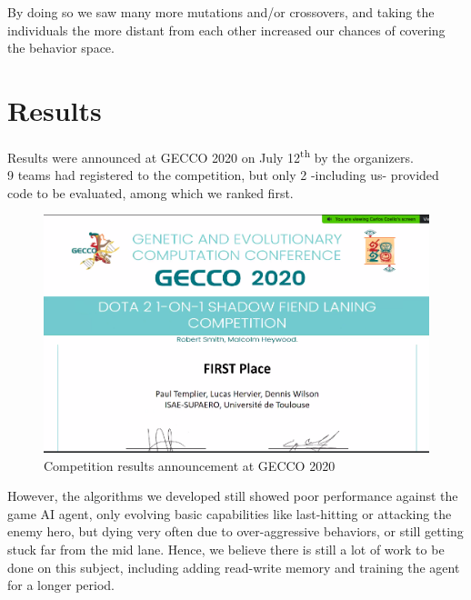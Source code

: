 By doing so we saw many more mutations and/or crossovers, and taking the individuals the more distant from each other increased our chances of covering the behavior space.

\section{Results}

Results were announced at GECCO 2020 on July 12\textsuperscript{th} by the organizers. \\
9 teams had registered to the competition, but only 2 -including us- provided code to be evaluated, among which we ranked first. \\

\begin{figure}[H]
\centering
\includegraphics[width=12cm]{images/breezy-win.png}
\caption{Competition results announcement at GECCO 2020}
\end{figure}
However, the algorithms we developed still showed poor performance against the game AI agent, only evolving basic capabilities like last-hitting or attacking the enemy hero, but dying very often due to over-aggressive behaviors, or still getting stuck far from the mid lane. Hence, we believe there is still a lot of work to be done on this subject, including adding read-write memory and training the agent for a longer period.

